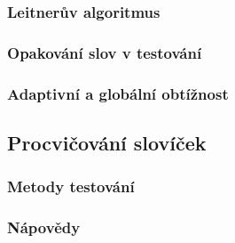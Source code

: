 \documentclass[a4paper,11pt,titlepage,fleqn]{article}
\begin{document}
        \subsubsection{Leitnerův algoritmus}

        \subsubsection{Opakování slov v testování}
            \label{repeating}

        \subsubsection{Adaptivní a globální obtížnost}


    \subsection{Procvičování slovíček}

        \subsubsection{Metody testování}
    
        \subsubsection{Nápovědy}
\end{document}
